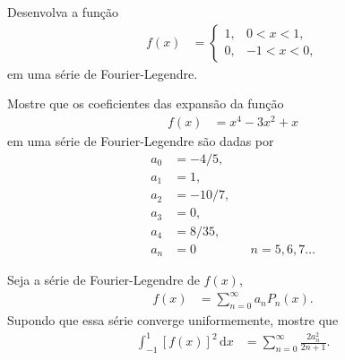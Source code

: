 \documentclass[a4paper,12pt, leqno, answers]{exam}
\begin{document}
\thispagestyle{empty}

\newpage
\setcounter{page}{1}
\begin{questions}
    \question Desenvolva a fun\c{c}\~{a}o
    \begin{align*}
        f(x) &= \begin{cases}
            1, & 0 < x < 1, \\
            0, & -1 < x < 0,
        \end{cases}
    \end{align*}
    em uma s\'{e}rie de Fourier-Legendre.
    \begin{solution}
    \end{solution}

    \question Mostre que os coeficientes das expans\~{a}o da fun\c{c}\~{a}o
    \begin{align*}
        f(x) &= x^4 - 3 x^2 + x
    \end{align*}
    em uma s\'{e}rie de Fourier-Legendre s\~{a}o dadas por
    \begin{align*}
        a_0 &= -4/5, \\
        a_1 &= 1, \\
        a_2 &= -10/7, \\
        a_3 &= 0, \\
        a_4 &= 8/35, \\
        a_n &= 0 && n = 5, 6, 7 \ldots
    \end{align*}
    \begin{solution}
    \end{solution}

    \question Seja a s\'{e}rie de Fourier-Legendre de $f(x)$,
    \begin{align*}
        f(x) &= \sum_{n = 0}^\infty a_n P_n(x).
    \end{align*}
    Supondo que essa s\'{e}rie converge uniformemente, mostre que
    \begin{align*}
        \int_{-1}^1 \left[ f(x) \right]^ 2 \,\mathrm{d}x &= \sum_{n = 0}^\infty \frac{2 a_n^2}{2 n + 1}.
    \end{align*}
    \begin{solution}
    \end{solution}


\end{questions}
\end{document}
